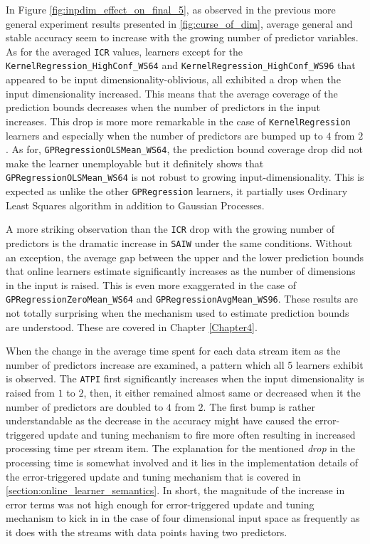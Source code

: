 In Figure \ref{fig:inpdim_effect_on_final_5}, as observed in the previous more general experiment results presented in \ref{fig:curse_of_dim}, average general and stable accuracy seem to increase with the growing number of predictor variables.  As for the averaged \texttt{ICR} values, learners except for the \texttt{KernelRegression\_HighConf\_WS64} and \texttt{KernelRegression\_HighConf\_WS96} that appeared to be input dimensionality-oblivious, all exhibited a drop when the input dimensionality increased. This means that the average coverage of the prediction bounds decreases when the number of predictors in the input increases. This drop is more more remarkable in the case of \texttt{KernelRegression} learners and especially when the number of predictors are bumped up to $4$ from $2$. As for, \texttt{GPRegressionOLSMean\_WS64}, the prediction bound coverage drop did not make the learner unemployable but it definitely shows that \texttt{GPRegressionOLSMean\_WS64} is not robust to growing input-dimensionality. This is expected as unlike the other \texttt{GPRegression} learners, it partially uses Ordinary Least Squares algorithm in addition to Gaussian Processes.

A more striking observation than the \texttt{ICR} drop with the growing number of predictors is the dramatic increase in \texttt{SAIW} under the same conditions. Without an exception, the average gap between the upper and the lower prediction bounds that online learners estimate significantly increases as the number of dimensions in the input is raised. This is even more exaggerated in the case of \texttt{GPRegressionZeroMean\_WS64} and \texttt{GPRegressionAvgMean\_WS96}. These results are not totally surprising when the mechanism used to estimate prediction bounds are understood. These are covered in Chapter \ref{Chapter4}.

When the change in the average time spent for each data stream item as the number of predictors increase are examined, a pattern which all 5 learners exhibit is observed. The \texttt{ATPI} first significantly increases when the input dimensionality is raised from $1$ to $2$, then, it either remained almost same or decreased when it the number of predictors are doubled to $4$ from $2$. The first bump is rather understandable as the decrease in the accuracy might have caused the error-triggered update and tuning mechanism to fire more often resulting in increased processing time per stream item. The explanation for the mentioned \textit{drop} in the processing time is somewhat involved and it lies in the implementation details of the error-triggered update and tuning mechanism that is covered in \ref{section:online_learner_semantics}. In short, the magnitude of the increase in error terms was not high enough for error-triggered update and tuning mechanism to kick in in the case of four dimensional input space as frequently as it does with the streams with data points having two predictors.

